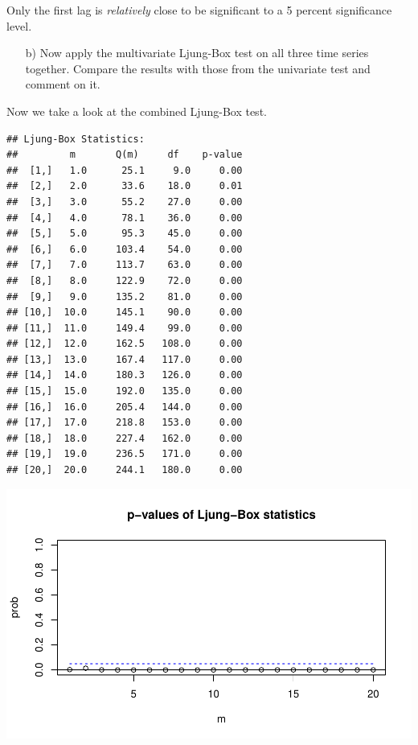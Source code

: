 \documentclass[12pt,a4paper]{article}
\newenvironment{Shaded}{\begin{snugshade}}{\end{snugshade}}
\newcommand{\DataTypeTok}[1]{\textcolor[rgb]{0.13,0.29,0.53}{#1}}
\newcommand{\DecValTok}[1]{\textcolor[rgb]{0.00,0.00,0.81}{#1}}
\newcommand{\KeywordTok}[1]{\textcolor[rgb]{0.13,0.29,0.53}{\textbf{#1}}}
\newcommand{\NormalTok}[1]{#1}
\newcommand{\OperatorTok}[1]{\textcolor[rgb]{0.81,0.36,0.00}{\textbf{#1}}}
\begin{document}
Only the first lag is \emph{relatively} close to be significant to a 5
percent significance level.

\begin{itemize}
  \item[b)] Now apply the multivariate Ljung-Box test on all three time series together. Compare the results with those from the univariate test and comment on it.
\end {itemize}

Now we take a look at the combined Ljung-Box test.

\begin{Shaded}
\end{Shaded}

\begin{verbatim}
## Ljung-Box Statistics:  
##         m       Q(m)     df    p-value
##  [1,]   1.0      25.1     9.0     0.00
##  [2,]   2.0      33.6    18.0     0.01
##  [3,]   3.0      55.2    27.0     0.00
##  [4,]   4.0      78.1    36.0     0.00
##  [5,]   5.0      95.3    45.0     0.00
##  [6,]   6.0     103.4    54.0     0.00
##  [7,]   7.0     113.7    63.0     0.00
##  [8,]   8.0     122.9    72.0     0.00
##  [9,]   9.0     135.2    81.0     0.00
## [10,]  10.0     145.1    90.0     0.00
## [11,]  11.0     149.4    99.0     0.00
## [12,]  12.0     162.5   108.0     0.00
## [13,]  13.0     167.4   117.0     0.00
## [14,]  14.0     180.3   126.0     0.00
## [15,]  15.0     192.0   135.0     0.00
## [16,]  16.0     205.4   144.0     0.00
## [17,]  17.0     218.8   153.0     0.00
## [18,]  18.0     227.4   162.0     0.00
## [19,]  19.0     236.5   171.0     0.00
## [20,]  20.0     244.1   180.0     0.00
\end{verbatim}

\includegraphics{exercise_1_files/figure-latex/unnamed-chunk-6-1.pdf}
\end{document}
